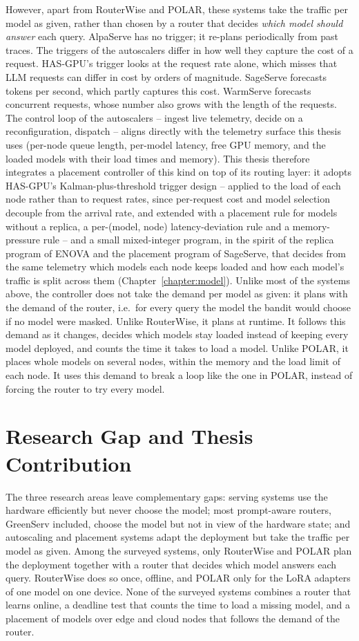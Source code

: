 However, apart from RouterWise and POLAR, these systems take the traffic per model as given, rather than chosen by a router that decides \emph{which model should answer} each query.
AlpaServe has no trigger; it re-plans periodically from past traces.
The triggers of the autoscalers differ in how well they capture the cost of a request.
HAS-GPU's trigger looks at the request rate alone, which misses that LLM requests can differ in cost by orders of magnitude.
SageServe forecasts tokens per second, which partly captures this cost.
WarmServe forecasts concurrent requests, whose number also grows with the length of the requests.
The control loop of the autoscalers -- ingest live telemetry, decide on a reconfiguration, dispatch -- aligns directly with the telemetry surface this thesis uses (per-node queue length, per-model latency, free GPU memory, and the loaded models with their load times and memory).
This thesis therefore integrates a placement controller of this kind on top of its routing layer: it adopts HAS-GPU's Kalman-plus-threshold trigger design -- applied to the load of each node rather than to request rates, since per-request cost and model selection decouple from the arrival rate, and extended with a placement rule for models without a replica, a per-(model, node) latency-deviation rule and a memory-pressure rule -- and a small mixed-integer program, in the spirit of the replica program of ENOVA and the placement program of SageServe, that decides from the same telemetry which models each node keeps loaded and how each model's traffic is split across them (Chapter~\ref{chapter:model}).
Unlike most of the systems above, the controller does not take the demand per model as given: it plans with the demand of the router, i.e.\ for every query the model the bandit would choose if no model were masked.
Unlike RouterWise, it plans at runtime.
It follows this demand as it changes, decides which models stay loaded instead of keeping every model deployed, and counts the time it takes to load a model.
Unlike POLAR, it places whole models on several nodes, within the memory and the load limit of each node.
It uses this demand to break a loop like the one in POLAR, instead of forcing the router to try every model.

\section{Research Gap and Thesis Contribution}

The three research areas leave complementary gaps:
serving systems use the hardware efficiently but never choose the model;
most prompt-aware routers, GreenServ included, choose the model but not in view of the hardware state;
and autoscaling and placement systems adapt the deployment but take the traffic per model as given.
Among the surveyed systems, only RouterWise and POLAR plan the deployment together with a router that decides which model answers each query.
RouterWise does so once, offline, and POLAR only for the LoRA adapters of one model on one device.
None of the surveyed systems combines a router that learns online, a deadline test that counts the time to load a missing model, and a placement of models over edge and cloud nodes that follows the demand of the router.

